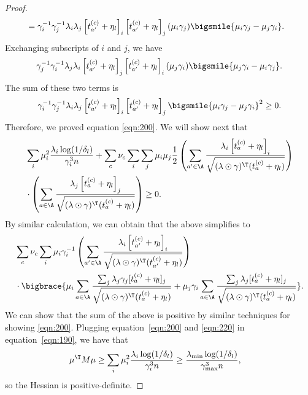 \documentclass{article}
\newcommand{\1}{\mathbf{1}}
\begin{document}
\begin{proof}
\begin{align*}
    &= \gamma_i^{-1}\gamma_j^{-1}\lambda_{i} \lambda_{j}\left[t_{a'}^{(c)}+\eta_l\right]_{i}\left[t_{a'}^{(c)}+\eta_l\right]_{j}(\mu_i\gamma_j)\bigsmile{\mu_i\gamma_j-\mu_j\gamma_i}.
\end{align*}
Exchanging subscripts of $i$ and $j$, we have 
\[\gamma_j^{-1}\gamma_i^{-1}\lambda_{j} \lambda_{i}\left[t_{a'}^{(c)}+\eta_l\right]_{j}\left[t_{a'}^{(c)}+\eta_l\right]_{i}(\mu_j\gamma_i)\bigsmile{\mu_j\gamma_i-\mu_i\gamma_j}.\]
The sum of these two terms is 
\[\gamma_i^{-1}\gamma_j^{-1}\lambda_{i} \lambda_{j}\left[t_{a'}^{(c)}+\eta_l\right]_{i}\left[t_{a'}^{(c)}+\eta_l\right]_{j}\bigsmile{\mu_i\gamma_j-\mu_j\gamma_i}^2\geq 0.\]
Therefore, we proved equation \eqref{eqn:200}. We will show next that 
\begin{align}
    &\sum_{i}\mu_i^2\frac{\lambda_i\log(1/\delta_l)}{\gamma_i^3 n}+\sum_{c}\nu_c\sum_{i}\sum_{j}\mu_i\mu_j\frac{1}{2}\left(\sum_{a^{\prime} \in \A} \frac{\lambda_{i}\left[t_{a}^{(c)}+\eta_l\right]_{i}}{\sqrt{(\lambda\odot\gamma)^\T (t_a^{(c)}+\eta_l)}}\right)\nonumber\\
    &\cdot\left(\sum_{a \in \A} \frac{\lambda_{j}\left[t_{a}^{(c)}+\eta_l\right]_{j}}{\sqrt{(\lambda\odot\gamma)^\T (t_a^{(c)}+\eta_l)}}\right)\geq 0.\label{eqn:220}
\end{align}
By similar calculation, we can obtain that the above simplifies to
\begin{align*}
    &\sum_{c}\nu_c\sum_i \mu_i\gamma_i^{-1}\left(\sum_{a^{\prime} \in \A} \frac{\lambda_{i}\left[t_{a'}^{(c)}+\eta_l\right]_{i}}{\sqrt{(\lambda\odot\gamma)^\T (t_{a'}^{(c)}+\eta_l)}}\right)\\
    &\cdot\bigbrace{\mu_i\sum_{a\in\A}\frac{\sum_j \lambda_j\gamma_j[t_a^{(c)}+\eta_l]_j}{\sqrt{(\lambda\odot\gamma)^\T (t_{a}^{(c)}+\eta_l)}}+\mu_j\gamma_i\sum_{a\in\A}\frac{\sum_j \lambda_j[t_a^{(c)}+\eta_l]_j}{\sqrt{(\lambda\odot\gamma)^\T (t_{a}^{(c)}+\eta_l)}}}.
\end{align*}
We can show that the sum of the above is positive by similar techniques for showing \eqref{eqn:200}. 
Plugging equation~\ref{eqn:200} and \ref{eqn:220} in equation~\ref{eqn:190}, we have that 
\begin{align*}
    \mu^\T M\mu &\geq  \sum_{i}\mu_i^2\frac{\lambda_i\log(1/\delta_l)}{\gamma_i^3 n}\geq \frac{\lambda_{\min}\log(1/\delta_l)}{\gamma_{\max}^3 n},
\end{align*}
so the Hessian is positive-definite. 
\end{proof}
\end{document}
